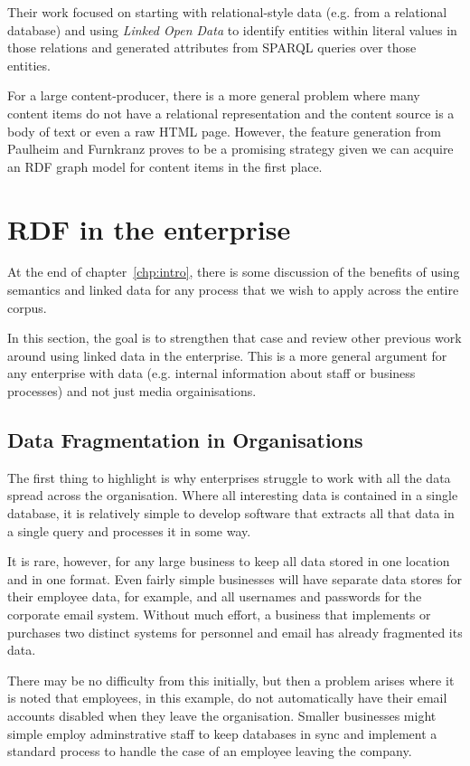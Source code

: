 Their work focused on starting with relational-style data (e.g. from a
relational database) and using \emph{Linked Open Data} to identify entities
within literal values in those relations and generated attributes from
SPARQL queries over those entities.

For a large content-producer, there is a more general problem where many content
items do not have a relational representation and the content source is a body
of text or even a raw HTML page. However, the feature generation from Paulheim
and F\:urnkranz proves to be a promising strategy given we can acquire an RDF
graph model for content items in the first place.

\section{RDF in the enterprise}
\label{sec:linked-enterprise-data}

At the end of chapter~\ref{chp:intro}, there is some discussion of the
benefits of using semantics and linked data for any process that we wish
to apply across the entire corpus.

In this section, the goal is to strengthen that case and review other
previous work around using linked data in the enterprise. This is a more
general argument for any enterprise with data (e.g. internal information
about staff or business processes) and not just media orgainisations.

\subsection{Data Fragmentation in Organisations}

The first thing to highlight is why enterprises struggle to work with all
the data spread across the organisation. Where all interesting data is
contained in a single database, it is relatively simple to develop software
that extracts all that data in a single query and processes it in some way.

It is rare, however, for any large business to keep all data stored in
one location and in one format. Even fairly simple businesses will have
separate data stores for their employee data, for example, and all
usernames and passwords for the corporate email system. Without much effort,
a business that implements or purchases two distinct systems for personnel
and email has already fragmented its data.

There may be no difficulty from this initially, but then a problem arises
where it is noted that employees, in this example, do not automatically have
their email accounts disabled when they leave the organisation. Smaller
businesses might simple employ adminstrative staff to keep databases in
sync and implement a standard process to handle the case of an employee
leaving the company.


